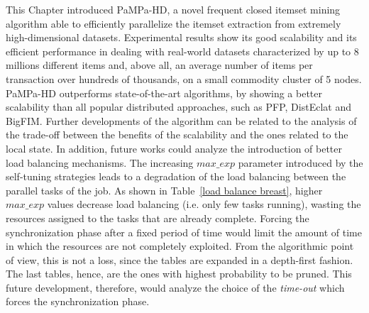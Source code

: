 This Chapter introduced PaMPa-HD,
a novel frequent closed itemset mining algorithm
able to efficiently parallelize the itemset extraction from extremely
high-dimensional datasets.
Experimental results show its good scalability
and its efficient performance in dealing with real-world datasets
characterized by up to 8 millions different items
and, above all, an average number of items per transaction
over hundreds of thousands,
on a small commodity cluster of 5 nodes.
PaMPa-HD outperforms state-of-the-art algorithms, by showing a better
scalability than all popular distributed approaches, such as PFP,
DistEclat and BigFIM.
Further developments of the algorithm can be related to the analysis of the trade-off between the benefits of the scalability and the ones related to the local state. 
In addition, future works could analyze the introduction of better load balancing mechanisms. The increasing $max\_exp$ parameter introduced by the self-tuning strategies leads to a degradation of the load balancing between the parallel tasks of the job. As shown in Table~\ref{load balance breast}, higher $max\_exp$ values decrease load balancing (i.e. only few tasks running), wasting the resources assigned to the tasks that are already complete.
Forcing the synchronization phase after a fixed period of time would limit the amount of time in which the resources are not completely exploited. From the algorithmic point of view, this is not a loss, since the tables are expanded in a depth-first fashion. The last tables, hence, are the ones with highest probability to be pruned. This future development, therefore, would analyze the choice of the \textit{time-out} which forces the synchronization phase.

